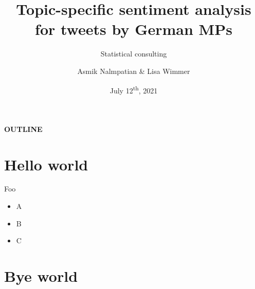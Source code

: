 \documentclass[10pt, t, aspectratio = 1610]{beamer}
\title[Consulting \LaTeX\ Beamer theme]{Topic-specific sentiment analysis for 
tweets by German MPs}
\subtitle{Statistical consulting}
\author{Asmik Nalmpatian \& Lisa Wimmer}
\date{July 12\textsuperscript{th}, 2021}
\begin{document}
{


  
  
  \begin{frame}
    \titlepage
  \end{frame}
  
}	


\begin{frame}[noframenumbering]{}

\vspace{2em}
\huge{\textbf{OUTLINE}}

\vfill

\tableofcontents

\vfill

\end{frame}


\section{Hello world}
\label{hello}


\begin{frame}{Foo}

\begin{itemize}
  \item A \citep{abdaretal2021}
  \item B
  \item C
\end{itemize}

\end{frame} 


\section{Bye world}
\label{bye}
\end{document}
